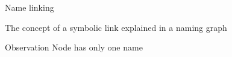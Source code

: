 \begin{slide}{Name linking}
  \begin{block}{The concept of a symbolic link explained in a naming graph}
    \begin{center}
    \end{center}
  \end{block}
  \begin{alertblock}{Observation} 
    Node  has only one name
  \end{alertblock}
\end{slide}
